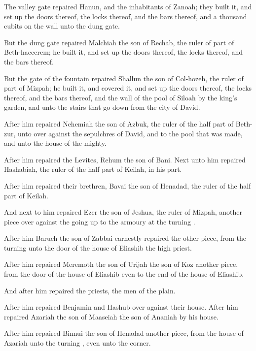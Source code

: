 {The
valley
gate
repaired
Hanun, and the
inhabitants of
Zanoah; they
built it, and set
up the
doors thereof, the
locks thereof, and the
bars thereof, and a
thousand
cubits on the
wall unto the
dung
gate.

But the
dung
gate
repaired
Malchiah the
son of
Rechab, the
ruler of
part of
Beth-haccerem; he
built it, and set
up the
doors thereof, the
locks thereof, and the
bars thereof.

But the
gate of the
fountain
repaired
Shallun the
son of
Col-hozeh, the
ruler of
part of
Mizpah; he
built it, and
covered it, and set
up the
doors thereof, the
locks thereof, and the
bars thereof, and the
wall of the
pool of
Siloah by the
king’s
garden, and unto the
stairs that go
down from the
city of
David.

After him
repaired
Nehemiah the
son of
Azbuk, the
ruler of the
half
part of
Beth-zur, unto
{} over against the
sepulchres of
David, and to the
pool that was
made, and unto the
house of the
mighty.

After him
repaired the
Levites,
Rehum the
son of
Bani. Next unto
him
repaired
Hashabiah, the
ruler of the
half
part of
Keilah, in his
part.

After him
repaired their
brethren,
Bavai the
son of
Henadad, the
ruler of the
half
part of
Keilah.

And next to
him
repaired
Ezer the
son of
Jeshua, the
ruler of
Mizpah,
another
piece over against the going
up to the
armoury at the
turning
{}.

After him
Baruch the
son of
Zabbai
earnestly
repaired the
other
piece, from the
turning
{} unto the
door of the
house of
Eliashib the
high
priest.

After him
repaired
Meremoth the
son of
Urijah the
son of
Koz
another
piece, from the
door of the
house of
Eliashib even to the
end of the
house of
Eliashib.

And
after him
repaired the
priests, the
men of the
plain.

After him
repaired
Benjamin and
Hashub over against their
house.
After him
repaired
Azariah the
son of
Maaseiah the
son of
Ananiah
by his
house.

After him
repaired
Binnui the
son of
Henadad
another
piece, from the
house of
Azariah unto the
turning
{}, even unto the
corner.

}
